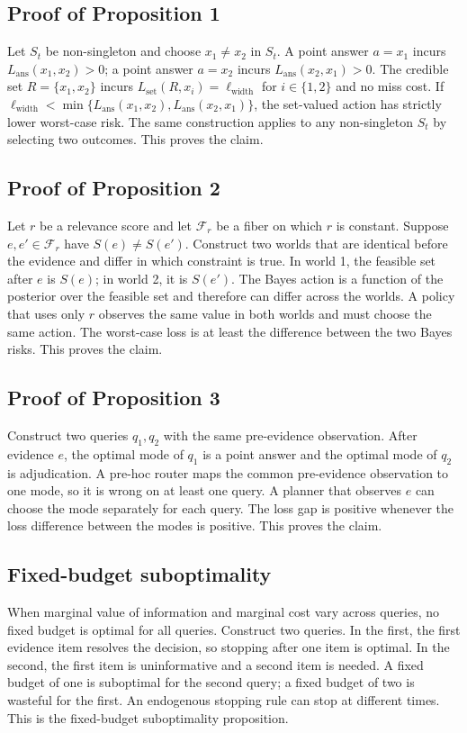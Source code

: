 \documentclass[11pt]{article}
\begin{document}
\subsection{Proof of Proposition 1}
Let $S_t$ be non-singleton and choose $x_1\neq x_2$ in $S_t$. A point answer $a=x_1$ incurs $L_{\text{ans}}(x_1,x_2)>0$; a point answer $a=x_2$ incurs $L_{\text{ans}}(x_2,x_1)>0$. The credible set $R=\{x_1,x_2\}$ incurs $L_{\text{set}}(R,x_i)=\ell_{\text{width}}$ for $i\in\{1,2\}$ and no miss cost. If $\ell_{\text{width}}<\min\{L_{\text{ans}}(x_1,x_2),L_{\text{ans}}(x_2,x_1)\}$, the set-valued action has strictly lower worst-case risk. The same construction applies to any non-singleton $S_t$ by selecting two outcomes. This proves the claim.

\subsection{Proof of Proposition 2}
Let $r$ be a relevance score and let $\mathcal F_r$ be a fiber on which $r$ is constant. Suppose $e,e'\in\mathcal F_r$ have $S(e)\neq S(e')$. Construct two worlds that are identical before the evidence and differ in which constraint is true. In world 1, the feasible set after $e$ is $S(e)$; in world 2, it is $S(e')$. The Bayes action is a function of the posterior over the feasible set and therefore can differ across the worlds. A policy that uses only $r$ observes the same value in both worlds and must choose the same action. The worst-case loss is at least the difference between the two Bayes risks. This proves the claim.

\subsection{Proof of Proposition 3}
Construct two queries $q_1,q_2$ with the same pre-evidence observation. After evidence $e$, the optimal mode of $q_1$ is a point answer and the optimal mode of $q_2$ is adjudication. A pre-hoc router maps the common pre-evidence observation to one mode, so it is wrong on at least one query. A planner that observes $e$ can choose the mode separately for each query. The loss gap is positive whenever the loss difference between the modes is positive. This proves the claim.

\subsection{Fixed-budget suboptimality}
When marginal value of information and marginal cost vary across queries, no fixed budget is optimal for all queries. Construct two queries. In the first, the first evidence item resolves the decision, so stopping after one item is optimal. In the second, the first item is uninformative and a second item is needed. A fixed budget of one is suboptimal for the second query; a fixed budget of two is wasteful for the first. An endogenous stopping rule can stop at different times. This is the fixed-budget suboptimality proposition.
\end{document}
